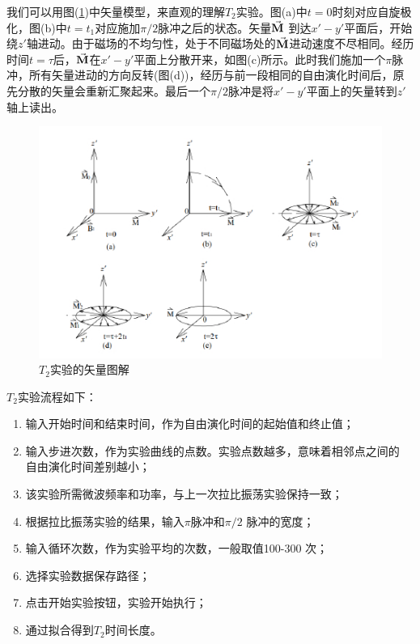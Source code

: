 \documentclass[a4paper]{article}
\begin{document}
我们可以用图(\ref{fig:t2v})中矢量模型，来直观的理解$ T_2  $实验。图(a)中$ t = 0  $时刻对应自旋极化，图(b)中$ t = t_1  $对应施加$ \pi/2 $脉冲之后的状态。矢量$ \va{M} $ 到达$ x' - y'  $平面后，开始绕$ z' $轴进动。由于磁场的不均匀性，处于不同磁场处的$ \va{M} $进动速度不尽相同。经历时间$ t = \tau  $后，$ \va{M} $在$ x'-y'  $平面上分散开来，如图(c)所示。此时我们施加一个$ \pi  $脉冲，所有矢量进动的方向反转(图(d))，经历与前一段相同的自由演化时间后，原先分散的矢量会重新汇聚起来。最后一个$ \pi/2 $脉冲是将$ x' - y'  $平面上的矢量转到$ z' $轴上读出。
\begin{figure}[H]
	\centering
	\includegraphics[width=0.65\linewidth]{fig/t2v.jpg}
	\caption{$ T_2 $实验的矢量图解}
	\label{fig:t2v}
\end{figure}

$ T_2  $实验流程如下：
\begin{enumerate}
	\item 输入开始时间和结束时间，作为自由演化时间的起始值和终止值；
	\item 输入步进次数，作为实验曲线的点数。实验点数越多，意味着相邻点之间的
	自由演化时间差别越小；
	\item 该实验所需微波频率和功率，与上一次拉比振荡实验保持一致；
	\item 根据拉比振荡实验的结果，输入$ \pi $脉冲和$ \pi/2 $
	脉冲的宽度；
	\item 输入循环次数，作为实验平均的次数，一般取值100-300 次；
	\item 选择实验数据保存路径；
	\item 点击开始实验按钮，实验开始执行；
	\item 通过拟合得到$ T_2  $时间长度。
\end{enumerate}
\end{document}
